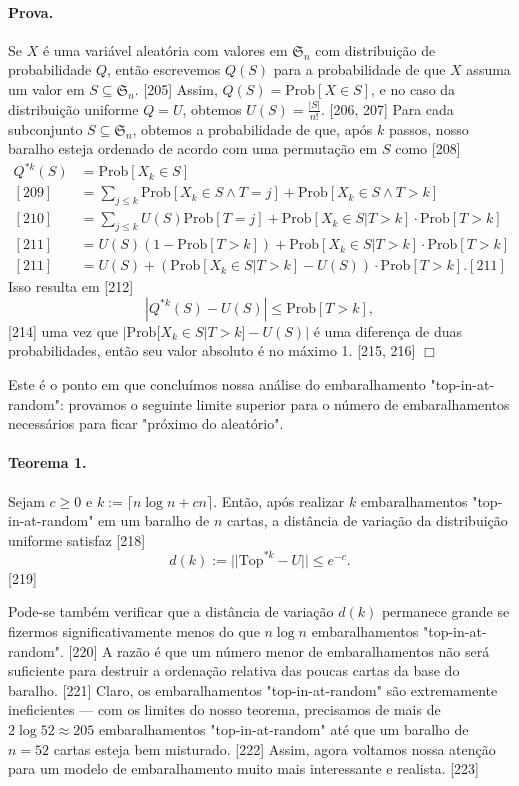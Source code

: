 \documentclass[a4paper]{article}
\begin{document}
\paragraph{Prova.} Se $X$ é uma variável aleatória com valores em $\mathfrak{S}_n$ com distribuição de probabilidade $Q$, então escrevemos $Q(S)$ para a probabilidade de que $X$ assuma um valor em $S \subseteq \mathfrak{S}_n$. [205] Assim, $Q(S) = \text{Prob}[X \in S]$, e no caso da distribuição uniforme $Q=U$, obtemos $U(S) = \frac{|S|}{n!}$. [206, 207] Para cada subconjunto $S \subseteq \mathfrak{S}_n$, obtemos a probabilidade de que, após $k$ passos, nosso baralho esteja ordenado de acordo com uma permutação em $S$ como [208]
\begin{align*}
    Q^{*k}(S) &= \text{Prob}[X_k \in S] \\ [209]
    &= \sum_{j \le k} \text{Prob}[X_k \in S \wedge T=j] + \text{Prob}[X_k \in S \wedge T>k] \\ [210]
    &= \sum_{j \le k} U(S)\text{Prob}[T=j] + \text{Prob}[X_k \in S | T > k] \cdot \text{Prob}[T>k] \\ [211]
    &= U(S)(1 - \text{Prob}[T>k]) + \text{Prob}[X_k \in S | T > k] \cdot \text{Prob}[T>k] \\ [211]
    &= U(S) + (\text{Prob}[X_k \in S | T > k] - U(S)) \cdot \text{Prob}[T>k]. [211]
\end{align*}
Isso resulta em [212]
$$ |Q^{*k}(S) - U(S)| \le \text{Prob}[T > k], $$ [214]
uma vez que $|\text{Prob}[X_k \in S|T>k] - U(S)|$ é uma diferença de duas probabilidades, então seu valor absoluto é no máximo 1. [215, 216] \hfill $\Box$

Este é o ponto em que concluímos nossa análise do embaralhamento "top-in-at-random": provamos o seguinte limite superior para o número de embaralhamentos necessários para ficar "próximo do aleatório".

\paragraph{Teorema 1.} Sejam $c \ge 0$ e $k := \lceil n \log n + cn \rceil$. Então, após realizar $k$ embaralhamentos "top-in-at-random" em um baralho de $n$ cartas, a distância de variação da distribuição uniforme satisfaz [218]
$$ d(k) := ||\text{Top}^{*k} - U|| \le e^{-c}. $$ [219]

Pode-se também verificar que a distância de variação $d(k)$ permanece grande se fizermos significativamente menos do que $n \log n$ embaralhamentos "top-in-at-random". [220] A razão é que um número menor de embaralhamentos não será suficiente para destruir a ordenação relativa das poucas cartas da base do baralho. [221] Claro, os embaralhamentos "top-in-at-random" são extremamente ineficientes — com os limites do nosso teorema, precisamos de mais de $2 \log 52 \approx 205$ embaralhamentos "top-in-at-random" até que um baralho de $n=52$ cartas esteja bem misturado. [222] Assim, agora voltamos nossa atenção para um modelo de embaralhamento muito mais interessante e realista. [223]
\end{document}
